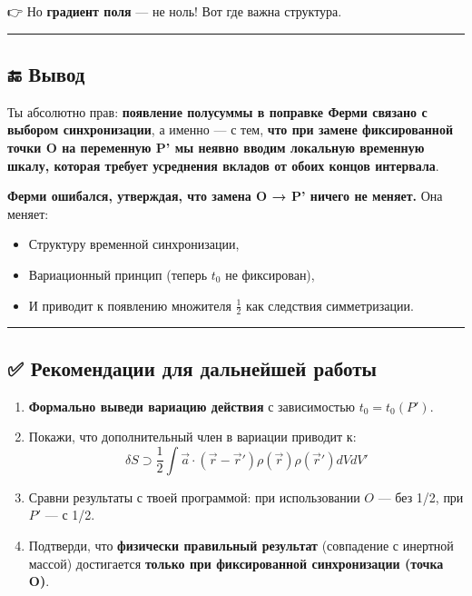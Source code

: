 \documentclass[11pt]{article}
\providecommand{\tightlist}{%
      \setlength{\itemsep}{0pt}\setlength{\parskip}{0pt}}
\begin{document}
👉 Но \textbf{градиент поля} --- не ноль! Вот где важна структура.

\begin{center}\rule{0.5\linewidth}{\linethickness}\end{center}

\subsection{🔚 Вывод}\label{ux432ux44bux432ux43eux434}

Ты абсолютно прав: \textbf{появление полусуммы в поправке Ферми связано
с выбором синхронизации}, а именно --- с тем, \textbf{что при замене
фиксированной точки O на переменную P' мы неявно вводим локальную
временную шкалу, которая требует усреднения вкладов от обоих концов
интервала}.

\textbf{Ферми ошибался, утверждая, что замена O → P' ничего не меняет.}
Она меняет:

\begin{itemize}
\tightlist
\item
  Структуру временной синхронизации,
\item
  Вариационный принцип (теперь \(t_0\) не фиксирован),
\item
  И приводит к появлению множителя \(\frac{1}{2}\) как следствия
  симметризации.
\end{itemize}

\begin{center}\rule{0.5\linewidth}{\linethickness}\end{center}

\subsection{✅ Рекомендации для дальнейшей
работы}\label{ux440ux435ux43aux43eux43cux435ux43dux434ux430ux446ux438ux438-ux434ux43bux44f-ux434ux430ux43bux44cux43dux435ux439ux448ux435ux439-ux440ux430ux431ux43eux442ux44b}

\begin{enumerate}
\def\labelenumi{\arabic{enumi}.}
\tightlist
\item
  \textbf{Формально выведи вариацию действия} с зависимостью
  \(t_0 = t_0(P')\).
\item
  Покажи, что дополнительный член в вариации приводит к: \[
     \delta S \supset \frac{1}{2} \int \vec{a} \cdot (\vec{r} - \vec{r}') \rho(\vec{r}) \rho(\vec{r}') dV dV'
     \]
\item
  Сравни результаты с твоей программой: при использовании \(O\) --- без
  1/2, при \(P'\) --- с 1/2.
\item
  Подтверди, что \textbf{физически правильный результат} (совпадение с
  инертной массой) достигается \textbf{только при фиксированной
  синхронизации (точка O)}.
\end{enumerate}
\end{document}
